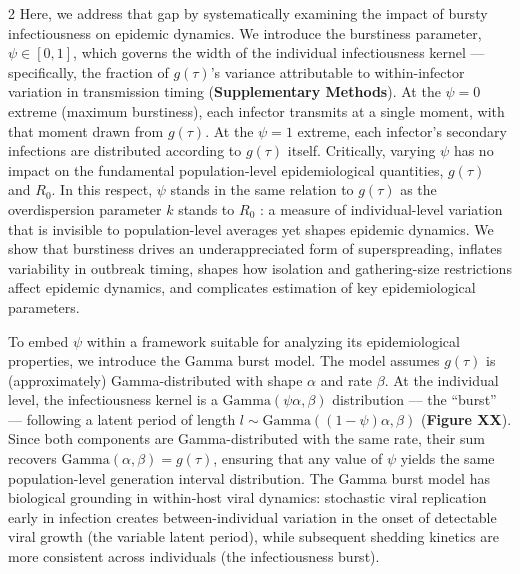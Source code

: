 \documentclass[10pt]{article}
\begin{document}
\begin{multicols}{2}
Here, we address that gap by systematically examining the impact of bursty infectiousness on epidemic dynamics. We introduce the burstiness parameter, $\psi \in [0,1]$, which governs the width of the individual infectiousness kernel --- specifically, the fraction of $g(\tau)$'s variance attributable to within-infector variation in transmission timing ({\bf Supplementary Methods}). At the $\psi = 0$ extreme (maximum burstiness), each infector transmits at a single moment, with that moment drawn from $g(\tau)$. At the $\psi = 1$ extreme, each infector's secondary infections are distributed according to $g(\tau)$ itself. Critically, varying $\psi$ has no impact on the fundamental population-level epidemiological quantities, $g(\tau)$ and $R_0$. In this respect, $\psi$ stands in the same relation to $g(\tau)$ as the overdispersion parameter $k$ stands to $R_0$ \citep{lloyd-smith_superspreading_2005}: a measure of individual-level variation that is invisible to population-level averages yet shapes epidemic dynamics. We show that burstiness drives an underappreciated form of superspreading, inflates variability in outbreak timing, shapes how isolation and gathering-size restrictions affect epidemic dynamics, and complicates estimation of key epidemiological parameters.

To embed $\psi$ within a framework suitable for analyzing its epidemiological properties, we introduce the Gamma burst model. The model assumes $g(\tau)$ is (approximately) Gamma-distributed with shape $\alpha$ and rate $\beta$. At the individual level, the infectiousness kernel is a $\text{Gamma}(\psi \alpha, \beta)$ distribution --- the ``burst'' --- following a latent period of length $l \sim \text{Gamma}((1-\psi) \alpha, \beta)$ ({\bf Figure XX}). Since both components are Gamma-distributed with the same rate, their sum recovers $\text{Gamma}(\alpha, \beta) = g(\tau)$, ensuring that any value of $\psi$ yields the same population-level generation interval distribution. The Gamma burst model has biological grounding in within-host viral dynamics: stochastic viral replication early in infection creates between-individual variation in the onset of detectable viral growth (the variable latent period), while subsequent shedding kinetics are more consistent across individuals (the infectiousness burst)\citep{morris_random_2025}.


\end{multicols}
\end{document}
